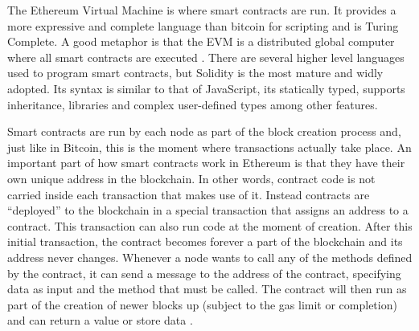 \documentclass{article}
\begin{document}
The Ethereum Virtual Machine is where smart contracts are run. It provides a more expressive and complete language than bitcoin for scripting and is Turing Complete. A good metaphor is that the EVM is a distributed global computer where all smart contracts are executed \citep{58_the_hitchhikers_guide_to_smart_contracts_in_ethereum_2017}. There are several higher level languages used to program smart contracts, but Solidity is the most mature and widly adopted. Its syntax is similar to that of JavaScript, its statically typed, supports inheritance, libraries and complex user-defined types among other features.

Smart contracts are run by each node as part of the block creation process and, just like in Bitcoin, this is the moment where transactions actually take place. An important part of how smart contracts work in Ethereum is that they have their own unique address in the blockchain. In other words, contract code is not carried inside each transaction that makes use of it. Instead contracts are ``deployed'' to the blockchain in a special transaction that assigns an address to a contract. This transaction can also run code at the moment of creation. After this initial transaction, the contract becomes forever a part of the blockchain and its address never changes. Whenever a node wants to call any of the methods defined by the contract, it can send a message to the address of the contract, specifying data as input and the method that must be called. The contract will then run as part of the creation of newer blocks up (subject to the gas limit or completion) and can return a value or store data \citep{59_peyrott_senanayaka_2017}.
\end{document}
